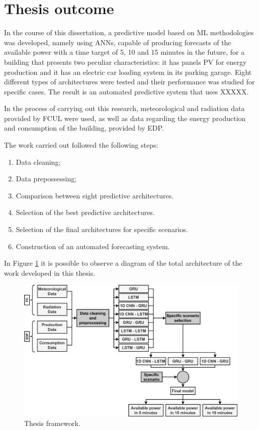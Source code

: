 \section{Thesis outcome}


In the course of this dissertation, a predictive model based on \ac{ML} methodologies was developed, namely using \ac{ANN}s, capable of producing forecasts of the available power with a time target of 5, 10 and 15 minutes in the future, for a building that presents two peculiar characteristics: it has panels \ac{PV} for energy production and it has an electric car loading system in its parking garage. Eight different types of architectures were tested and their performance was studied for specific cases. The result is an automated predictive system that uses XXXXX.

In the process of carrying out this research, meteorological and radiation data provided by \ac{FCUL} were used, as well as data regarding the energy production and consumption of the building, provided by \ac{EDP}.

The work carried out followed the following steps:
\begin{enumerate}[noitemsep,topsep=0pt]
  \itemsep0em 
  \item Data cleaning;
  \item Data prepossessing;
  \item Comparison between eight predictive architectures.
  \item Selection of the best predictive architectures.
  \item Selection of the final architectures for specific scenarios.
  \item Construction of an automated forecasting system.
\end{enumerate}


In Figure \ref{scope} it is possible to observe a diagram of the total architecture of the work developed in this thesis. 

\begin{figure}[h!]
    \centering
    \begin{center}
    \includegraphics[width=1\textwidth]{Images/Work.png}
    \caption{Thesis framework.}
    \label{scope}
    \end{center}
\end{figure}

